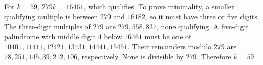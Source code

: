 For $k=59$, $279k=16461$, which qualifies. To prove minimality, a smaller qualifying multiple is between $279$ and $16182$, so it must have three or five digits. The three-digit multiples of $279$ are $279,558,837$, none qualifying. A five-digit palindrome with middle digit $4$ below $16461$ must be one of $10401,11411,12421,13431,14441,15451$. Their remainders modulo $279$ are $78,251,145,39,212,106$, respectively. None is divisible by $279$. Therefore $\boxed{k=59}$.
